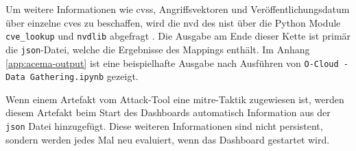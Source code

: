 \par Um weitere Informationen wie \gls{cvss}, Angriffsvektoren und Veröffentlichungsdatum über einzelne \glspl{cve} zu beschaffen, wird die \gls{nvd} des \gls{nist} über die Python Module \verb|cve_lookup| und \verb|nvdlib| abgefragt \autocite{NVDLibNVDLibNIST,MachineThingCve_lookupLook,NVDHome}. Die Ausgabe am Ende dieser Kette ist primär die \verb|json|-Datei, welche die Ergebnisse des Mappings enthält. Im Anhang \ref{app:acema-output} ist eine beispielhafte Ausgabe nach Ausführen von \verb|O-Cloud - Data Gathering.ipynb| gezeigt.
\par Wenn einem Artefakt vom Attack-Tool eine \gls{mitre}-Taktik zugewiesen ist, werden diesem Artefakt beim Start des Dashboards automatisch Information aus der \verb|json| Datei hinzugefügt. Diese weiteren Informationen sind nicht persistent, sondern werden jedes Mal neu evaluiert, wenn das Dashboard gestartet wird.
